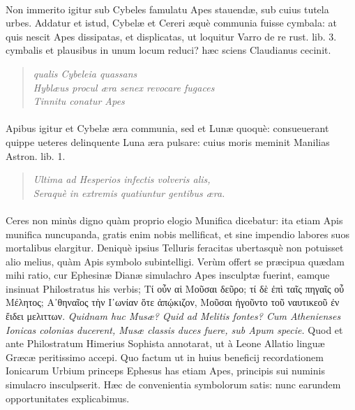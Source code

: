 \documentclass[a4paper, 11pt, oneside, polutonikogreek, latin]{article}
\begin{document}
\paragraph{}
Non immerito igitur sub Cybeles famulatu Apes stauendæ, sub cuius tutela urbes. Addatur et istud, Cybelæ et Cereri æquè communia fuisse cymbala: at quis nescit Apes dissipatas, et displicatas, ut loquitur Varro de re rust. lib. 3. cymbalis et plausibus in unum locum reduci? hæc sciens Claudianus cecinit.
\begin{quote}
\hspace*{15mm}\emph{qualis Cybeleia quassans}\\
\emph{Hyblæus procul æra senex revocare fugaces}\\
\emph{Tinnitu conatur Apes}\\
\end{quote}
\vspace*{-8mm}
\paragraph{}
Apibus igitur et Cybelæ æra communia, sed et Lunæ quoquè: consueuerant quippe ueteres delinquente Luna æra pulsare: cuius moris meminit Manilias Astron. lib. 1.
\begin{quote}
\emph{Ultima ad Hesperios infectis volveris alis,}\\
\emph{Seraquè in extremis quatiuntur gentibus æra.}\\
\end{quote}
\vspace*{-8mm}
\paragraph{}
Ceres non minùs digno quàm proprio elogio Munifica dicebatur: ita etiam Apis munifica nuncupanda, gratis enim nobis mellificat, et sine impendio labores suos mortalibus elargitur. Deniquè ipsius Telluris feracitas ubertasquè non potuisset alio melius, quàm Apis symbolo subintelligi. Verùm offert se præcipua quædam mihi ratio, cur Ephesinæ Dianæ simulachro Apes insculptæ fuerint, eamque insinuat Philostratus his verbis; \foreignlanguage{greek}{Τί οὖν αἱ Μοῦσαι δεῦρο; τί δὲ ἐπὶ ταῖς πηγαῖς οὖ Μέλητος; Α᾽θηναῖος τὴν Ι᾽ωνίαν ὅτε ἀπῴκιζον, Μοῦσαι ἡγοῦντο τοῦ ναυτικεοῦ ἐν ἔιδει μελιττων}. \emph{Quidnam huc Musæ? Quid ad Melitis fontes? Cum Athenienses Ionicas colonias ducerent, Musæ classis duces fuere, sub Apum specie.} Quod et ante Philostratum Himerius Sophista annotarat, ut à Leone Allatio linguæ Græcæ peritissimo accepi. Quo factum ut in huius beneficij recordationem Ionicarum Urbium princeps Ephesus has etiam Apes, principis sui numinis simulacro insculpserit. Hæc de convenientia symbolorum satis: nunc earundem opportunitates explicabimus.
\clearpage
\end{document}
